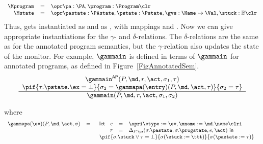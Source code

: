 \[
{\small
\begin{array}{rcl}
\Mprogram & =  & \opr \pa : \PA, \program : \Program \clr\\
\Mstate & = & \opr \pastate : \PAstate, \pstate : \Pstate, \gvs :  \Name \mapsto \Val, \stuck
: \mathbb{B} \clr
\end{array}}
\]
Thus, \FullProgram gets instantiated as \Mprogram and \FullState as
\Mstate, with mappings \program and \pstate. Now we can give
appropriate instantiations for the \(\gamma\)- and
\(\delta\)-relations. The \(\delta\)-relations are the same as
for the annotated program semantics, but the \(\gamma\)-relation also
updates the state of the monitor. For example, \(\gammain\) is defined
in terms of \(\gammain\) for annotated programs, as defined in
Figure~\ref{FigAnnotatedSem}. 
\[
{\small
\begin{array}{c}
\gammain^{\mathsf{AP}}(P, \md, r, \act, \sigma_1, \tau) \\
\pif{\tau.\pstate.\ex = \bot}
    {\sigma_2 = \gammapa(\entry)(P, \md, \act, \tau)}
    {\sigma_2 = \tau}\\
\hline
\gammain(P, \md, r, \act, \sigma_1, \sigma_2)
\end{array}}
\]


\noindent where
\[
{\small
\begin{array}{rcl}
\gammapa(\ev)(P, \md, \act, \sigma) & = &
\begin{array}[t]{l}
\mathsf{let\ }
\begin{array}[t]{rcl}
  e & = & \opri \etype := \ev, \mname := \md.\name \clri\\
 \tau & = & \Delta_{P.\pa}(\sigma.\pastate, \sigma.\progstate, e, \act)
\mathsf{\ in\ }\end{array}
\\
\pif{\sigma.\stuck \vee \tau = \bot}
    {\sigma (\stuck := \ttt)}
    {\sigma (\pastate := \tau)}
\end{array}
\end{array}}
\]





